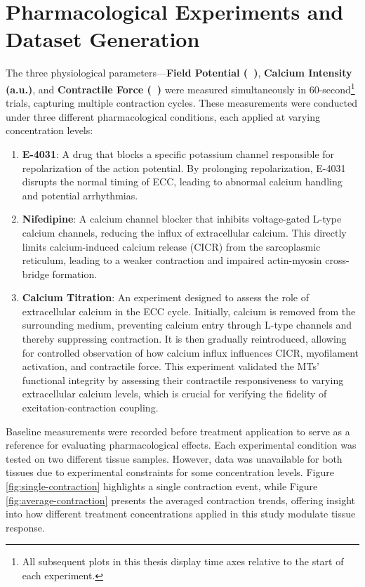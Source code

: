 \documentclass{report}
\begin{document}
        \section{Pharmacological Experiments and Dataset Generation}
        \label{sec:drugs}
            The three physiological parameters—\textbf{Field Potential (\SI{}{\textbf{\milli\newton}})}, \textbf{Calcium Intensity (a.u.)}, and \textbf{Contractile Force (\SI{}{\textbf{\milli\newton}})} were measured simultaneously in 60-second\footnote{All subsequent plots in this thesis display time axes relative to the start of each experiment.} trials, capturing multiple contraction cycles. These measurements were conducted under three different pharmacological conditions, each applied at varying concentration levels:
    
            \begin{enumerate}
                \item \textbf{E-4031}: A drug that blocks a specific potassium channel responsible for repolarization of the action potential. By prolonging repolarization, E-4031 disrupts the normal timing of ECC, leading to abnormal calcium handling and potential arrhythmias.
                
                \item \textbf{Nifedipine}: A calcium channel blocker that inhibits voltage-gated L-type calcium channels, reducing the influx of extracellular calcium. This directly limits calcium-induced calcium release (CICR) from the sarcoplasmic reticulum, leading to a weaker contraction and impaired actin-myosin cross-bridge formation.
                
                \item \textbf{Calcium Titration}: An experiment designed to assess the role of extracellular calcium in the ECC cycle. Initially, calcium is removed from the surrounding medium, preventing calcium entry through L-type channels and thereby suppressing contraction. It is then gradually reintroduced, allowing for controlled observation of how calcium influx influences CICR, myofilament activation, and contractile force. This experiment validated the MTs' functional integrity by assessing their contractile responsiveness to varying extracellular calcium levels, which is crucial for verifying the fidelity of excitation-contraction coupling.
            \end{enumerate}
            
            Baseline measurements were recorded before treatment application to serve as a reference for evaluating pharmacological effects. Each experimental condition was tested on two different tissue samples. However, data was unavailable for both tissues due to experimental constraints for some concentration levels. Figure \ref{fig:single-contraction} highlights a single contraction event, while Figure \ref{fig:average-contraction} presents the averaged contraction trends, offering insight into how different treatment concentrations applied in this study modulate tissue response.
\end{document}
